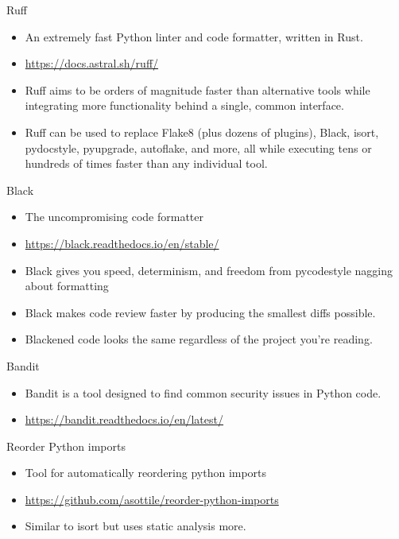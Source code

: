 \begin{frame}[c]{Ruff}
  \begin{itemize}
    \item An extremely fast Python linter and code formatter,
      written in Rust.
    \item \href{https://docs.astral.sh/ruff/}{https://docs.astral.sh/ruff/}
    \pausa
    \item Ruff aims to be orders of magnitude faster than alternative tools
      while integrating more functionality behind a single, common interface.
    \pausa
    \item Ruff can be used to replace Flake8 (plus dozens of plugins), Black,
      isort, pydocstyle, pyupgrade, autoflake, and more, all while executing
      tens or hundreds of times faster than any individual tool.
  \end{itemize}
\end{frame}

\begin{frame}[c]{Black}
  \begin{itemize}
    \item The uncompromising code formatter
    \item \href{https://black.readthedocs.io/en/stable/}{https://black.readthedocs.io/en/stable/}
    \pausa
    \item Black gives you speed, determinism, and freedom from pycodestyle
      nagging about formatting
    \pausa
    \item Black makes code review faster by producing the smallest diffs
      possible. 
    \item Blackened code looks the same regardless of the project you’re
      reading.
  \end{itemize}
\end{frame}

\begin{frame}[c]{Bandit}
  \begin{itemize}
    \item Bandit is a tool designed to find common security issues in
      Python code. 
    \item \href{https://bandit.readthedocs.io/en/latest/}{https://bandit.readthedocs.io/en/latest/}
  \end{itemize}
\end{frame}

\begin{frame}[c]{Reorder Python imports}
  \begin{itemize}
    \item Tool for automatically reordering python imports
    \item \href{https://github.com/asottile/reorder-python-imports}{https://github.com/asottile/reorder-python-imports}
    \pausa
    \item Similar to isort but uses static analysis more.
  \end{itemize}
\end{frame}

